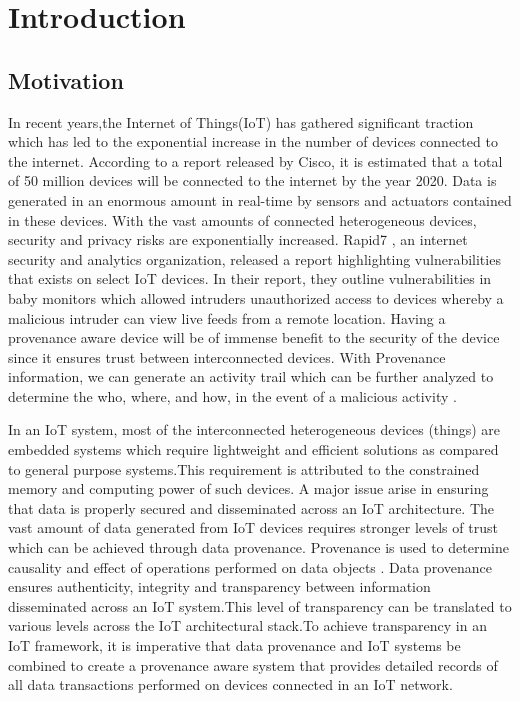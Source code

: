 \chapter{Introduction}\label{chapter:introduction}

\section{Motivation}
In recent years,the Internet of Things(IoT) has gathered significant traction which has led to the exponential increase in the number of devices connected to the internet. According to a report released by Cisco, it is estimated that a total of 50 million devices will be
connected to the internet by the year 2020. Data is generated in an enormous amount in real-time by sensors and actuators contained in these devices. With the vast amounts of connected heterogeneous devices,
security and privacy risks are exponentially increased. Rapid7 \cite{rapid7}, an  internet security and analytics organization, released a report highlighting vulnerabilities that exists on select IoT devices. In their report, they outline  vulnerabilities in
baby monitors which allowed intruders unauthorized access to devices
whereby a malicious intruder can view live feeds from a remote location. Having a provenance aware device will be of immense benefit to the security of the device since it ensures trust between interconnected devices. With Provenance information, we can generate an activity trail which can be further analyzed to determine the who, where, and how, in the event of a malicious activity \cite{cheney_provenance_2009}. 
\par In an IoT system, most of the interconnected heterogeneous devices (things) are embedded systems which
require lightweight and efficient solutions as compared to general purpose
systems.This requirement is attributed to the constrained memory and computing power of such
devices. A major issue arise in ensuring that data is properly secured and
disseminated across an IoT architecture. The vast amount of data generated from IoT
devices requires stronger levels of trust which can be achieved through data
provenance. Provenance is used to determine causality and effect of 
operations performed on data objects \cite{glavic_case_2011}. Data provenance ensures
authenticity, integrity and transparency between information disseminated across an
IoT system.This level of transparency can be translated to various levels across the IoT architectural stack.To achieve transparency in an IoT framework, it is imperative that data provenance and IoT systems be combined to create a provenance aware system that provides detailed records of all data
transactions performed on devices connected in an IoT network.






